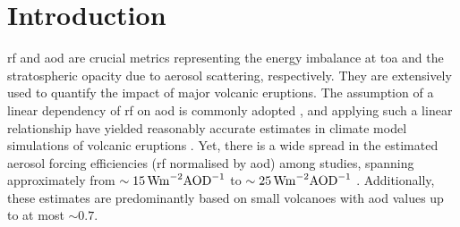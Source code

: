 \documentclass{ametsocV6.1}
\begin{document}

\section{Introduction}



\Gls{rf} and \gls{aod} are crucial metrics representing the energy imbalance at
\gls{toa} and the stratospheric opacity due to aerosol scattering, respectively. They
are extensively used to quantify the impact of major volcanic eruptions. The assumption
of a linear dependency of \gls{rf} on \gls{aod} is commonly adopted
\citep{myhre2013,andersson2015}, and applying such a linear relationship have yielded
reasonably accurate estimates in climate model simulations of volcanic eruptions
\citep{mills2017,hansen2005,gregory2016,marshall2020,pitari2016b}. Yet, there is a wide
spread in the estimated aerosol forcing efficiencies (\gls{rf} normalised by \gls{aod})
among studies, spanning approximately from \(\sim
\SI{15}{\watt\metre^{-2}\ce{AOD}^{-1}}\) \citep{pitari2016b} to \(\sim
\SI{25}{\watt\metre^{-2}\ce{AOD}^{-1}}\) \citep{myhre2013}. Additionally, these
estimates are predominantly based on small volcanoes with \gls{aod} values up to at most
\(\sim 0.7\).
\end{document}
